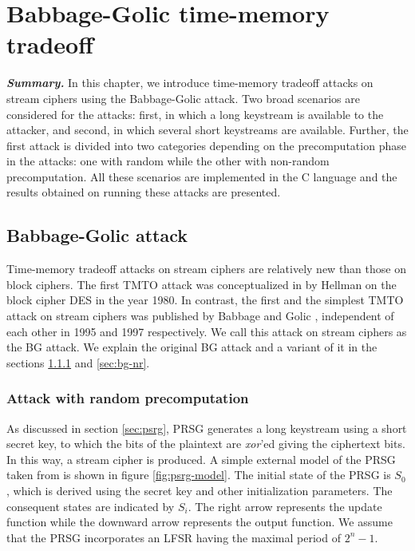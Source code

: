 \chapter{Babbage-Golic time-memory tradeoff}
\label{chap:bgtmto}
\indent \textbf{\textit{Summary.}} In this chapter, we introduce time-memory tradeoff attacks on stream ciphers using the Babbage-Golic attack. Two broad scenarios are considered for the attacks: first, in which a long keystream is available to the attacker, and second, in which several short keystreams are available. Further, the first attack is divided into two categories depending on the precomputation phase in the attacks: one with random while the other with non-random precomputation. All these scenarios are implemented in the C language and the results obtained on running these attacks are presented. 

\section{Babbage-Golic attack}
\label{sec:bg-keystream-attack}

Time-memory tradeoff attacks on stream ciphers are relatively new than those on block ciphers. The first TMTO attack was conceptualized in \cite{hellman1980ctm} by Hellman on the block cipher DES in the year 1980. In contrast, the first and the simplest TMTO attack on stream ciphers was published by Babbage \cite{babbage} and Golic \cite{golic}, independent of each other in 1995 and 1997 respectively. We call this attack on stream ciphers as the BG attack. We explain the original BG attack and a variant of it in the sections \ref{sec:bg-r} and \ref{sec:bg-nr}.

\subsection{Attack with random precomputation}
\label{sec:bg-r}

As discussed in section \ref{sec:psrg}, PRSG generates a long keystream using a short secret key, to which the bits of the plaintext are \emph{xor}'ed giving the ciphertext bits. In this way, a stream cipher is produced. A simple external model of the PRSG taken from \cite{babbage} is shown in figure \ref{fig:psrg-model}. The initial state of the PRSG is $S_0$, which is derived using the secret key and other initialization parameters. The consequent states are indicated by $S_i$. The right arrow represents the update function while the downward arrow represents the output function. We assume that the PRSG incorporates an LFSR having the maximal period of $2^{n} - 1$.

